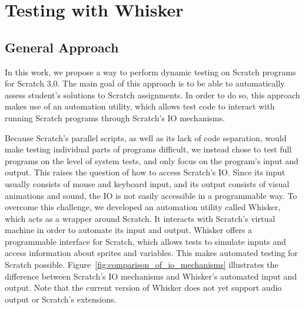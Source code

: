 \chapter{Testing with Whisker}
\label{cha:appraoch}

\section{General Approach}
\label{sec:general_appraoch}

In this work, we propose a way to perform dynamic testing on Scratch programs for Scratch 3.0.
The main goal of this approach is to be able to automatically assess student's solutions to Scratch assignments.
In order to do so, this approach makes use of an automation utility, which allows test code to
interact with running Scratch programs through Scratch's IO mechanisms.
\parspace

Because Scratch's parallel scripts, as well as its lack of code separation, would make testing individual parts of programs difficult,
we instead chose to test full programs on the level of system tests, and only focus on the program's input and output.
This raises the question of how to access Scratch's IO.
Since its input usually consists of mouse and keyboard input, and its output consists of visual animations and sound,
the IO is not easily accessible in a programmable way.
To overcome this challenge, we developed an automation utility called Whisker, which acts as a wrapper around Scratch.
It interacts with Scratch's virtual machine in order to automate its input and output.
Whisker offers a programmable interface for Scratch, which allows tests to simulate inputs and access information about sprites and variables.
This makes automated testing for Scratch possible.
Figure~\ref{fig:comparison_of_io_mechanisms} illustrates the difference between Scratch's IO mechanisms and Whisker's automated input and output.
Note that the current version of Whisker does not yet support audio output or Scratch's extensions.

